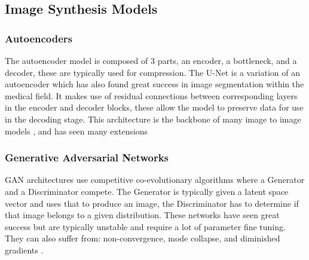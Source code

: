 \documentclass{UoYCSproject}
\begin{document}
\subsection{Image Synthesis Models}

\subsubsection{Autoencoders}

The autoencoder model is composed of 3 parts, an encoder, a bottleneck, and a decoder, these are typically used for compression. The U-Net \cite{ronneberger2015unet} is a variation of an autoencoder which has also found great success in image segmentation within the medical field. It makes use of residual connections between corresponding layers in the encoder and decoder blocks, these allow the model to preserve data for use in the decoding stage. This architecture is the backbone of many image to image models \cite{isola2018imagetoimage,saharia2022palette,dhariwal2021diffusion}, and has seen many extensions \cite{zhou2020unet, Qin_2020}

\subsubsection{Generative Adversarial Networks}





GAN architectures\cite{goodfellow2014generative} use competitive co-evolutionary algorithms where a Generator and a Discriminator compete. The Generator is typically given a latent space vector and uses that to produce an image, the Discriminator has to determine if that image belongs to a given distribution. These networks have seen great success \cite{zhu2020unpaired, karras2019stylebased, isola2018imagetoimage} but are typically unstable and require a lot of parameter fine tuning. They can also suffer from: non-convergence, mode collapse, and diminished gradients \cite{goodfellow2017nips}.
\end{document}
